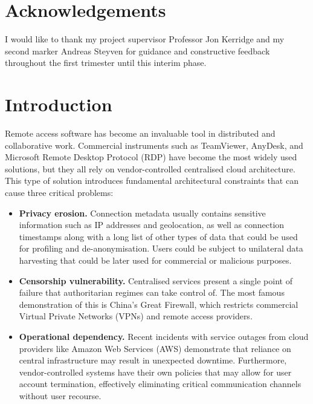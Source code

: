 \documentclass[12pt,a4paper]{article}
\begin{document}
\newpage

\section*{Acknowledgements}

I would like to thank my project supervisor Professor Jon Kerridge and my second marker Andreas Steyven for guidance and constructive feedback throughout the first trimester until this interim phase.

\newpage

\section{Introduction}

Remote access software has become an invaluable tool in distributed and collaborative work. Commercial instruments such as TeamViewer, AnyDesk, and Microsoft Remote Desktop Protocol (RDP) have become the most widely used solutions, but they all rely on vendor-controlled centralised cloud architecture. This type of solution introduces fundamental architectural constraints that can cause three critical problems:

\begin{itemize}
    \item \textbf{Privacy erosion.} Connection metadata usually contains sensitive information such as IP addresses and geolocation, as well as connection timestamps along with a long list of other types of data that could be used for profiling and de-anonymisation. Users could be subject to unilateral data harvesting that could be later used for commercial or malicious purposes.

    \item \textbf{Censorship vulnerability.} Centralised services present a single point of failure that authoritarian regimes can take control of. The most famous demonstration of this is China's Great Firewall, which restricts commercial Virtual Private Networks (VPNs) and remote access providers.

    \item \textbf{Operational dependency.} Recent incidents with service outages from cloud providers like Amazon Web Services (AWS) demonstrate that reliance on central infrastructure may result in unexpected downtime. Furthermore, vendor-controlled systems have their own policies that may allow for user account termination, effectively eliminating critical communication channels without user recourse.
\end{itemize}
\end{document}
